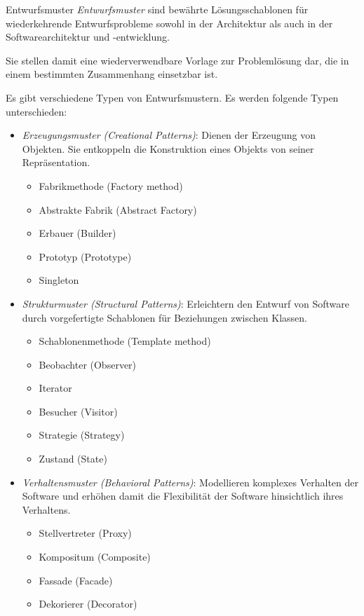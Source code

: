 \begin{defi}{Entwurfsmuster}
    \emph{Entwurfsmuster} sind bewährte Lösungsschablonen für wiederkehrende Entwurfsprobleme sowohl in der Architektur als auch in der Softwarearchitektur und -entwicklung.

    Sie stellen damit eine wiederverwendbare Vorlage zur Problemlösung dar, die in einem bestimmten Zusammenhang einsetzbar ist.

    Es gibt verschiedene Typen von Entwurfsmustern.
    Es werden folgende Typen unterschieden:
    \begin{itemize}
        \item \emph{Erzeugungsmuster (Creational Patterns)}:
              Dienen der Erzeugung von Objekten. Sie entkoppeln die Konstruktion eines Objekts von seiner Repräsentation.
              \begin{itemize}
                  \item Fabrikmethode (Factory method)
                  \item Abstrakte Fabrik (Abstract Factory)
                  \item Erbauer (Builder)
                  \item Prototyp (Prototype)
                  \item Singleton
              \end{itemize}
        \item \emph{Strukturmuster (Structural Patterns)}:
              Erleichtern den Entwurf von Software durch vorgefertigte Schablonen für Beziehungen zwischen Klassen.
              \begin{itemize}
                  \item Schablonenmethode (Template method)
                  \item Beobachter (Observer)
                  \item Iterator
                  \item Besucher (Visitor)
                  \item Strategie (Strategy)
                  \item Zustand (State)
              \end{itemize}
        \item \emph{Verhaltensmuster (Behavioral Patterns)}:
              Modellieren komplexes Verhalten der Software und erhöhen damit die Flexibilität der Software hinsichtlich ihres Verhaltens.
              \begin{itemize}
                  \item Stellvertreter (Proxy)
                  \item Kompositum (Composite)
                  \item Fassade (Facade)
                  \item Dekorierer (Decorator)
              \end{itemize}
    \end{itemize}
\end{defi}

